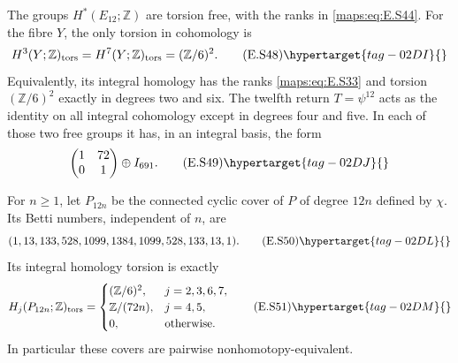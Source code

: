 \begin{theorem}\hypertarget{tag-02MF}{}\label{maps:src:E.2.15}


The groups $H^*(E_{12};\mathbb Z)$ are torsion free, with
the ranks in \eqref{maps:eq:E.S44}. For the fibre $Y$, the only
torsion in cohomology is
\[
       H^3(Y;\mathbb Z)_{\rm tors}
       =H^7(Y;\mathbb Z)_{\rm tors}=(\mathbb Z/6)^2.
 \tag{E.S48}\hypertarget{tag-02DI}{}\label{maps:eq:E.S48}
\]
Equivalently, its integral homology has the ranks \eqref{maps:eq:E.S33}
and torsion $(\mathbb Z/6)^2$ exactly in degrees two and six.
The twelfth return $T=\psi^{12}$ acts as the identity on
all integral cohomology except in degrees four and five.
In each of those two free groups it has, in an integral
basis, the form
\[
             \begin{pmatrix}1&72\\0&1\end{pmatrix}
                                  \oplus I_{691}.
 \tag{E.S49}\hypertarget{tag-02DJ}{}\label{maps:eq:E.S49}
\]

For $n\geq1$, let $P_{12n}$ be the connected cyclic cover
of $P$ of degree $12n$ defined by $\chi$. Its Betti numbers,
independent of $n$, are
\[
       (1,13,133,528,1099,1384,1099,528,133,13,1).
 \tag{E.S50}\hypertarget{tag-02DL}{}\label{maps:eq:E.S50}
\]
Its integral homology torsion is exactly
\[
 H_j(P_{12n};\mathbb Z)_{\rm tors}=
 \begin{cases}
       (\mathbb Z/6)^2,&j=2,3,6,7,\\
       \mathbb Z/(72n),&j=4,5,\\
       0,&\text{otherwise}.
 \end{cases}
 \tag{E.S51}\hypertarget{tag-02DM}{}\label{maps:eq:E.S51}
\]
In particular these covers are pairwise nonhomotopy-equivalent.
\end{theorem}


